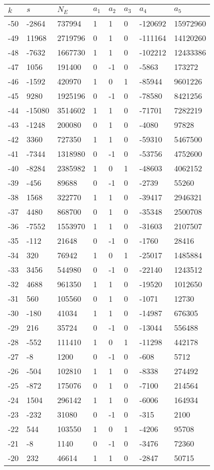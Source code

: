 \documentclass{amsart}
\begin{document}
\begin{longtable}{|l|l|l|lllll|}
\hline
$k$ & $s$ & $N_E$ & $a_1$ & $a_2$ & $a_3$ & $a_4$ & $a_5$\\
\hline
-50&-2864&737994&1&1&0&-120692&15972960\\
-49&11968&2719796&0&1&0&-111164&14120260\\
-48&-7632&1667730&1&1&0&-102212&12433386\\
-47&1056&191400&0&-1&0&-5863&173272\\
-46&-1592&420970&1&0&1&-85944&9601226\\
-45&9280&1925196&0&-1&0&-78580&8421256\\
-44&-15080&3514602&1&1&0&-71701&7282219\\
-43&-1248&200080&0&1&0&-4080&97828\\
-42&3360&727350&1&1&0&-59310&5467500\\
-41&-7344&1318980&0&-1&0&-53756&4752600\\
-40&-8284&2385982&1&0&1&-48603&4062152\\
-39&-456&89688&0&-1&0&-2739&55260\\
-38&1568&322770&1&1&0&-39417&2946321\\
-37&4480&868700&0&1&0&-35348&2500708\\
-36&-7552&1553970&1&1&0&-31603&2107507\\
-35&-112&21648&0&-1&0&-1760&28416\\
-34&320&76942&1&0&1&-25017&1485884\\
-33&3456&544980&0&-1&0&-22140&1243512\\
-32&4688&961350&1&1&0&-19520&1012650\\
-31&560&105560&0&1&0&-1071&12730\\
-30&-180&41034&1&1&0&-14987&676305\\
-29&216&35724&0&-1&0&-13044&556488\\
-28&-552&111410&1&0&1&-11298&442178\\
-27&-8&1200&0&-1&0&-608&5712\\
-26&-504&102810&1&1&0&-8338&274492\\
-25&-872&175076&0&1&0&-7100&214564\\
-24&1504&296142&1&1&0&-6006&164934\\
-23&-232&31080&0&-1&0&-315&2100\\
-22&544&103550&1&0&1&-4206&95708\\
-21&-8&1140&0&-1&0&-3476&72360\\
-20&232&46614&1&1&0&-2847&50715\\

\end{longtable}
\end{document}

